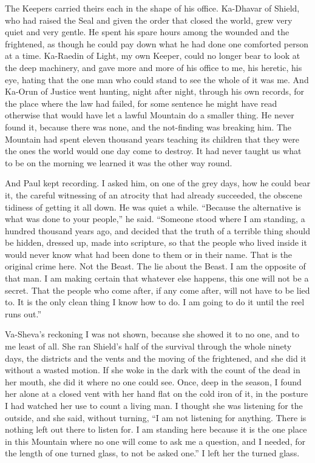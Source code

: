 The Keepers carried theirs each in the shape of his office. Ka-Dhavar of Shield, who had raised the Seal and given the order that closed the world, grew very quiet and very gentle. He spent his spare hours among the wounded and the frightened, as though he could pay down what he had done one comforted person at a time. Ka-Raedin of Light, my own Keeper, could no longer bear to look at the deep machinery, and gave more and more of his office to me, his heretic, his eye, hating that the one man who could stand to see the whole of it was me. And Ka-Orun of Justice went hunting, night after night, through his own records, for the place where the law had failed, for some sentence he might have read otherwise that would have let a lawful Mountain do a smaller thing. He never found it, because there was none, and the not-finding was breaking him. The Mountain had spent eleven thousand years teaching its children that they were the ones the world would one day come to destroy. It had never taught us what to be on the morning we learned it was the other way round.\par

And Paul kept recording. I asked him, on one of the grey days, how he could bear it, the careful witnessing of an atrocity that had already succeeded, the obscene tidiness of getting it all down. He was quiet a while. ``Because the alternative is what was done to your people,'' he said. ``Someone stood where I am standing, a hundred thousand years ago, and decided that the truth of a terrible thing should be hidden, dressed up, made into scripture, so that the people who lived inside it would never know what had been done to them or in their name. That is the original crime here. Not the Beast. The lie about the Beast. I am the opposite of that man. I am making certain that whatever else happens, this one will not be a secret. That the people who come after, if any come after, will not have to be lied to. It is the only clean thing I know how to do. I am going to do it until the reel runs out.''\par

Va-Sheva's reckoning I was not shown, because she showed it to no one, and to me least of all. She ran Shield's half of the survival through the whole ninety days, the districts and the vents and the moving of the frightened, and she did it without a wasted motion. If she woke in the dark with the count of the dead in her mouth, she did it where no one could see. Once, deep in the season, I found her alone at a closed vent with her hand flat on the cold iron of it, in the posture I had watched her use to count a living man. I thought she was listening for the outside, and she said, without turning, ``I am not listening for anything. There is nothing left out there to listen for. I am standing here because it is the one place in this Mountain where no one will come to ask me a question, and I needed, for the length of one turned glass, to not be asked one.'' I left her the turned glass.\par

